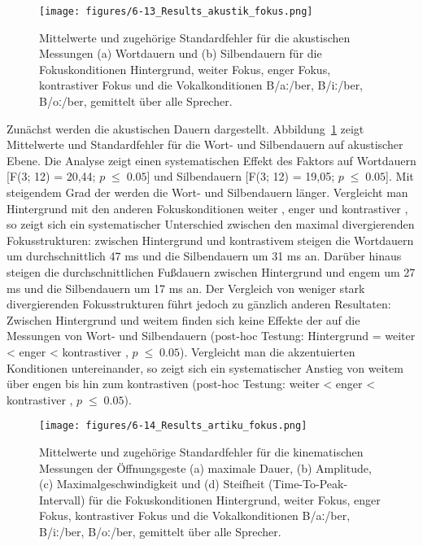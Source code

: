 \begin{figure}[b]
	\texttt{[image: figures/6-13\_Results\_akustik\_fokus.png]}
	\caption{Mittelwerte und zugehörige Standardfehler für die akustischen Messungen (a) Wortdauern und (b) Silbendauern für die Fokuskonditionen Hintergrund, weiter Fokus, enger Fokus, kontrastiver Fokus und die Vokalkonditionen  B/aː/ber, B/iː/ber, B/oː/ber, gemittelt über alle Sprecher.}
	\label{figure:0611}
\end{figure}

Zunächst werden die akustischen Dauern dargestellt. Abbildung~\ref{figure:0611} zeigt Mittelwerte und Standardfehler für die Wort- und Silbendauern auf akustischer Ebene. Die Analyse zeigt einen systematischen Effekt des Faktors  auf Wortdauern [F(3; 12) = 20,44; $p\;\leq\;0.05$] und Silbendauern [F(3; 12) = 19,05;  $p\;\leq\;0.05$]. Mit steigendem Grad der  werden die Wort- und Silbendauern länger. Vergleicht man Hintergrund mit den anderen Fokuskonditionen weiter , enger  und kontrastiver , so zeigt sich ein systematischer Unterschied zwischen den maximal divergierenden Fokusstrukturen: zwischen Hintergrund und kontrastivem  steigen die Wortdauern um durchschnittlich 47 ms und die Silbendauern um 31 ms an. Darüber hinaus steigen die durchschnittlichen Fußdauern zwischen Hintergrund und engem  um 27 ms und die Silbendauern um 17 ms an. Der Vergleich von weniger stark divergierenden Fokusstrukturen führt jedoch zu gänzlich anderen Resultaten: Zwischen Hintergrund und weitem  finden sich keine Effekte der  auf die Messungen von Wort- und Silbendauern (post-hoc Testung: Hintergrund = weiter  < enger  < kontrastiver , $p\;\leq\;0.05$). Vergleicht man die akzentuierten Konditionen untereinander, so zeigt sich ein systematischer Anstieg von weitem  über engen  bis hin zum kontrastiven  (post-hoc Testung: weiter  < enger  < kontrastiver , $p\;\leq\;0.05$).

\begin{figure}[t]
	\texttt{[image: figures/6-14\_Results\_artiku\_fokus.png]}
	\caption{Mittelwerte und zugehörige Standardfehler für die kinematischen Messungen der Öffnungsgeste (a) maximale Dauer, (b) Amplitude, (c) Maximalgeschwindigkeit und (d) Steifheit (Time-To-Peak-Intervall) für die Fokuskonditionen Hintergrund, weiter Fokus, enger Fokus, kontrastiver Fokus und die Vokalkonditionen B/aː/ber, B/iː/ber, B/oː/ber, gemittelt über alle Sprecher.}
	\label{figure:0612}
\end{figure}


